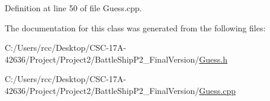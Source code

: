 Definition at line 50 of file Guess.\+cpp.



The documentation for this class was generated from the following files\+:\begin{DoxyCompactItemize}
\item 
C\+:/\+Users/rcc/\+Desktop/\+C\+S\+C-\/17\+A-\/42636/\+Project/\+Project2/\+Battle\+Ship\+P2\+\_\+\+Final\+Version/\hyperlink{_guess_8h}{Guess.\+h}\item 
C\+:/\+Users/rcc/\+Desktop/\+C\+S\+C-\/17\+A-\/42636/\+Project/\+Project2/\+Battle\+Ship\+P2\+\_\+\+Final\+Version/\hyperlink{_guess_8cpp}{Guess.\+cpp}\end{DoxyCompactItemize}

